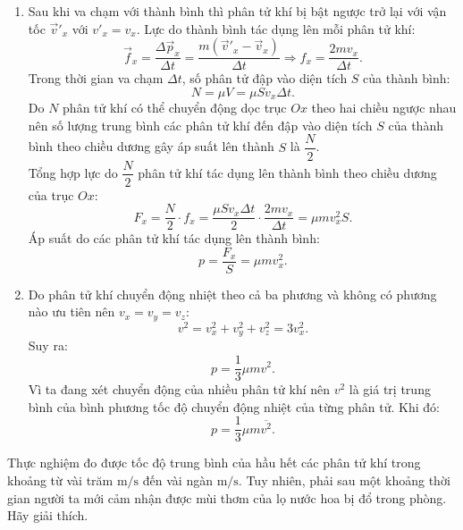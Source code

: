 \begin{vd}
{\begin{enumerate}[label=\alph*)]
\begin{itemize}
				\end{itemize}
				\item Sau khi va chạm với thành bình thì phân tử khí bị bật ngược trở lại với vận tốc $\vec{v}'_x$ với $v'_x=v_x$. Lực do thành bình tác dụng lên mỗi phân tử khí:
				$$\vec{f}_x=\dfrac{\Delta \vec{p}_x}{\Delta t}=\dfrac{m\left(\vec{v}'_x-\vec{v}_x\right)}{\Delta t}\Rightarrow f_x=\dfrac{2mv_x}{\Delta t}.$$
				Trong thời gian va chạm $\Delta t$, số phân tử đập vào diện tích $S$ của thành bình:
				$$N=\mu V=\mu Sv_x\Delta t.$$
				Do $N$ phân tử khí có thể chuyển động dọc trục $Ox$ theo hai chiều ngược nhau nên số lượng trung bình các phân tử khí đến đập vào diện tích $S$ của thành bình theo chiều dương gây áp suất lên thành $S$ là $\dfrac{N}{2}$.\\
				Tổng hợp lực do $\dfrac{N}{2}$ phân tử khí tác dụng lên thành bình theo chiều dương của trục $Ox$:
				$$F_x=\dfrac{N}{2}\cdot f_x=\dfrac{\mu Sv_x\Delta t}{2}\cdot\dfrac{2mv_x}{\Delta t}=\mu mv^2_xS.$$
				Áp suất do các phân tử khí tác dụng lên thành bình:
				$$p=\dfrac{F_x}{S}=\mu mv^2_x.$$
				\item Do phân tử khí chuyển động nhiệt theo cả ba phương và không có phương nào ưu tiên nên $v_x=v_y=v_z$:
				$$v^2=v^2_x+v^2_y+v^2_z=3v^2_x.$$
				Suy ra:
				$$p=\dfrac{1}{3}\mu mv^2.$$
				Vì ta đang xét chuyển động của nhiều phân tử khí nên $v^2$ là giá trị trung bình của bình phương tốc độ chuyển động nhiệt của từng phân tử. Khi đó:
				$$p=\dfrac{1}{3}\mu m\overline{v^2}.$$
			\end{enumerate}
	}
\end{vd}
\begin{vd}
	Thực nghiệm đo được tốc độ trung bình của hầu hết các phân tử khí trong khoảng từ vài trăm $\si{\meter/\second}$ đến vài ngàn $\si{\meter/\second}$. Tuy nhiên, phải sau một khoảng thời gian người ta mới cảm nhận được mùi thơm của lọ nước hoa bị đổ trong phòng. Hãy giải thích.
\end{vd}
